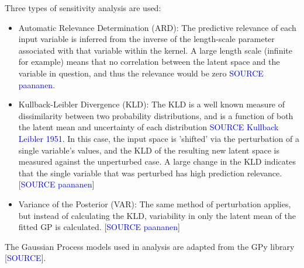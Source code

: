 \documentclass[a4paper, twoside, final, 12pt]{article}
\begin{document}
Three types of sensitivity analysis are used:
\begin{itemize}
	\item Automatic Relevance Determination (ARD): The predictive relevance of each input variable is inferred from the inverse of the length-scale parameter associated with that variable within the kernel. A large length scale (infinite for example) means that no correlation between the latent space and the variable in question, and thus the relevance would be zero \textcolor{blue}{SOURCE paananen}. 
	\item Kullback-Leibler Divergence (KLD): The KLD is a well known measure of dissimilarity between two probability distributions, and is a function of both the latent mean and uncertainty of each distribution \textcolor{blue}{SOURCE Kullback Leibler 1951}. In this case, the input space is 'shifted' via the perturbation of a single variable's values, and the KLD of the resulting new latent space is measured against the unperturbed case. A large change in the KLD indicates that the single variable that was perturbed has high prediction relevance.  [\textcolor{blue}{SOURCE paananen}]
	\item Variance of the Posterior (VAR): The same method of perturbation applies, but instead of calculating the KLD, variability in  only the latent mean of the fitted GP is calculated. [\textcolor{blue}{SOURCE paananen}]
\end{itemize}

The Gaussian Process models used in analysis are adapted from the GPy library [\textcolor{blue}{SOURCE}]. 
\end{document}
